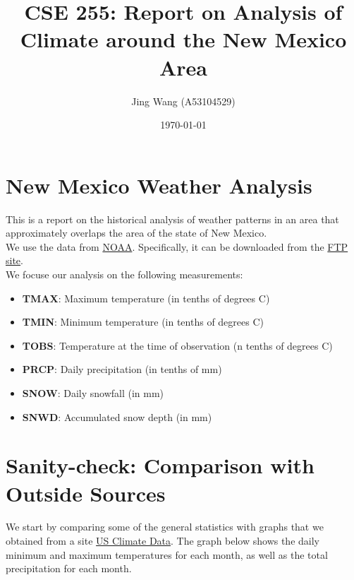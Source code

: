 \documentclass{article}
\begin{document}
\title{CSE 255: Report on Analysis of Climate around the New Mexico Area}
\author{Jing Wang (A53104529)}
\date{\today}
\maketitle

\section*{New Mexico Weather Analysis}

This is a report on the historical analysis of weather patterns in an area that approximately overlaps the area of the state of New Mexico. \\

We use the data from \href{https://www.ncdc.noaa.gov/}{NOAA}. Specifically, it can be downloaded from the \href{ftp://ftp.ncdc.noaa.gov/pub/data/ghcn/daily/}{FTP site}. \\

We focuse our analysis on the following measurements:
\begin{itemize}
  \item \textbf{TMAX}: Maximum temperature (in tenths of degrees C)
  \item \textbf{TMIN}: Minimum temperature (in tenths of degrees C)
  \item \textbf{TOBS}: Temperature at the time of observation (n tenths of degrees C)
  \item \textbf{PRCP}: Daily precipitation (in tenths of mm)
  \item \textbf{SNOW}: Daily snowfall (in mm)
  \item \textbf{SNWD}: Accumulated snow depth (in mm)
\end{itemize}


\section*{Sanity-check: Comparison with Outside Sources}
We start by comparing some of the general statistics with graphs that we obtained from a site \href{http://www.usclimatedata.com/climate/new-mexico/united-states/3201#}{US Climate Data}. The graph below shows the daily minimum and maximum temperatures for each month, as well as the total precipitation for each month. \\
\end{document}

